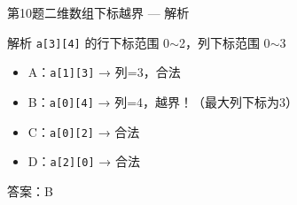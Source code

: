 \begin{frame}{第10题}{二维数组下标越界 --- 解析}
    \begin{alertblock}{解析}
        \footnotesize \texttt{a[3][4]} 的行下标范围 0$\sim$2，列下标范围 0$\sim$3
        \begin{itemize}
            \setlength{\itemsep}{0pt}
            \item A：\texttt{a[1][3]} → 列=3，合法
            \item {\color{highlight}B：\texttt{a[0][4]} → 列=4，越界！（最大列下标为3）}
            \item C：\texttt{a[0][2]} → 合法
            \item D：\texttt{a[2][0]} → 合法
        \end{itemize}
        {\color{highlight}答案：B}
    \end{alertblock}
\end{frame}
